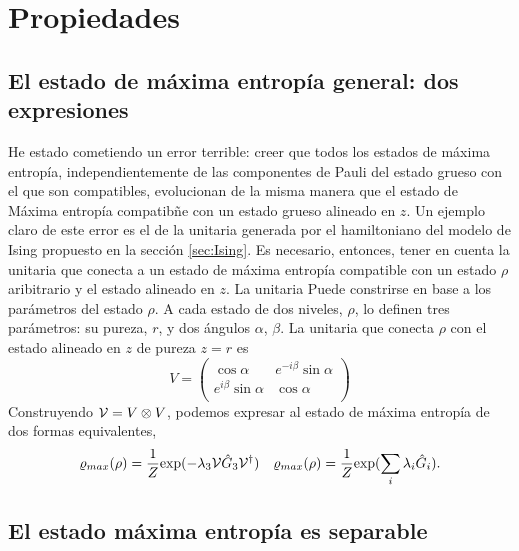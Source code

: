 \section{Propiedades}



\subsection{El estado de máxima entropía general: dos expresiones}
He estado cometiendo un error terrible: creer que todos los estados de máxima entropía, independientemente de las componentes de Pauli del estado grueso con el que son compatibles, evolucionan de la misma manera que el estado de Máxima entropía compatibñe con un estado grueso alineado en $z$. Un ejemplo claro de este error es el de la unitaria generada por el hamiltoniano del modelo de Ising propuesto en la sección \ref{sec:Ising}. Es necesario, entonces, tener en cuenta la unitaria que conecta a un estado de máxima entropía compatible con un estado $\rho$ aribitrario y el estado alineado en $z$. La unitaria Puede constrirse en base a los parámetros del estado $\rho$. A cada estado de dos niveles, $\rho$, lo definen tres parámetros: su pureza, $r$, y dos ángulos $\alpha$, $\beta$. La unitaria que conecta $\rho$ con el estado alineado en $z$ de pureza $z=r$ es 
\begin{equation}
  V=
  \begin{pmatrix}
      \cos{\alpha} & e^{-i\beta}\sin{\alpha}\\
      e^{i\beta}\sin{\alpha}& \cos{\alpha}\\
  \end{pmatrix}
\end{equation}
Construyendo $\mathcal{V}=V\otimes V$, podemos expresar al estado de máxima entropía de dos formas equivalentes,
\begin{align}\label{eq:MaxEntTwoExpr}
  \varrho_{max}(\rho)=\frac{1}{Z}\text{exp}(-\lambda_{3}\mathcal{V}\hat{G}_{3}\mathcal{V}^{\dag}) && \varrho_{max}(\rho)=\frac{1}{Z}\text{exp}(\sum_{i}\lambda_{i}\hat{G}_{i}).
\end{align}

\subsection{El estado máxima entropía es separable}

